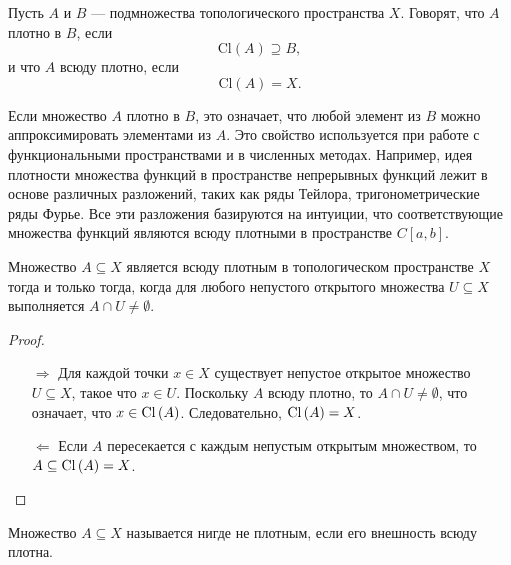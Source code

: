 \begin{definition}
	Пусть \( A \) и \( B \) — подмножества топологического пространства \( X \). Говорят, что \( A \) плотно в \( B \), если 
\[
\text{Cl}(A) \supseteq B,
\]
и что \( A \) всюду плотно, если 
\[
\text{Cl}(A) = X.
\]
\end{definition}

Если множество \( A \) плотно в \( B \), это означает, что любой элемент из \( B \) можно аппроксимировать элементами из \( A \). Это свойство используется при работе с функциональными пространствами и в численных методах. Например, идея плотности множества функций в пространстве непрерывных функций лежит в основе различных разложений, таких как ряды Тейлора, тригонометрические ряды Фурье. Все эти разложения базируются на интуиции, что соответствующие множества функций являются всюду плотными в пространстве \( C[a, b] \).

\begin{theorem}
	Множество \( A \subseteq X \) является всюду плотным в топологическом пространстве \( X \) тогда и только тогда, когда для любого непустого открытого множества \( U \subseteq X \) выполняется \( A \cap U \neq \emptyset \).
\end{theorem}
\begin{proof} \
	\begin{itemize}
		\item[\(\boxed{\Longrightarrow}\)] Для каждой точки \( x \in X \) существует непустое открытое множество \( U \subseteq X \), такое что \( x \in U \). Поскольку \( A \) всюду плотно, то \( A \cap U \neq \emptyset \), что означает, что \( x \in \mathrm{Cl}\left(A\right) \). Следовательно, \( \mathrm{Cl}\left(A\right) = X \).
		\item[\(\boxed{\Longleftarrow}\)]  Если \( A \) пересекается с каждым непустым открытым множеством, то \( A \subseteq \mathrm{Cl}\left(A\right) = X \). 
	\end{itemize}
\end{proof}

\begin{definition}
	Множество \( A \subseteq X \) называется нигде не плотным, если его внешность всюду плотна.
\end{definition}

